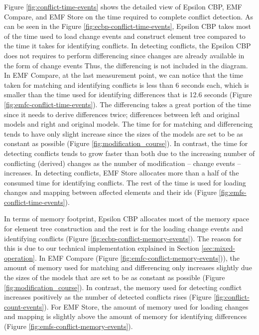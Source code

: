 Figure \ref{fig:conflict-time-events} shows the detailed view of Epsilon CBP, EMF Compare, and EMF Store on the time required to complete conflict detection. As can be seen in the Figure \ref{fig:ecbp-conflict-time-events}, Epsilon CBP takes most of the time used to load change events and construct element tree compared to the time it takes for identifying conflicts. In detecting conflicts, the Epsilon CBP does not requires to perform differencing since changes are already available in the form of change events Thus, the differencing is not included in the diagram. In EMF Compare, at the last measurement point, we can notice that the time taken for matching and identifying conflicts is less than 6 seconds each, which is smaller than the time used for identifying differences that is 12.6 seconds (Figure \ref{fig:emfc-conflict-time-events}). The differencing takes a great portion of the time since it needs to derive differences twice; differences between left and original models and right and original models. The time for for matching and differencing tends to have only slight increase since the sizes of the models are set to be as constant as possible (Figure \ref{fig:modification_course}). In contrast, the time for detecting conflicts tends to grow faster than both due to the increasing number of conflicting (derived) changes as the number of modification -- change events -- increases. In detecting conflicts, EMF Store allocates more than a half of the consumed time for identifying conflicts. The rest of the time is used for loading changes and mapping between affected elements and their ids (Figure \ref{fig:emfs-conflict-time-events}). 

In terms of memory footprint, Epsilon CBP allocates most of the memory space for element tree construction and the rest is for the loading change events and identifying conflicts (Figure \ref{fig:ecbp-conflict-memory-events}). The reason for this is due to our technical implementation explained in Section \ref{sec:mixed-operation}. In EMF Compare (Figure \ref{fig:emfc-conflict-memory-events})), the amount of memory used for matching and differencing only increases slightly due the sizes of the models that are set to be as constant as possible (Figure \ref{fig:modification_course}). In contrast, the memory used for detecting conflict increases positively as the number of detected conflicts rises (Figure \ref{fig:conflict-count-events}). For EMF Store, the amount of memory used for loading changes and mapping is slightly above the amount of memory for identifying differences (Figure \ref{fig:emfs-conflict-memory-events}).


